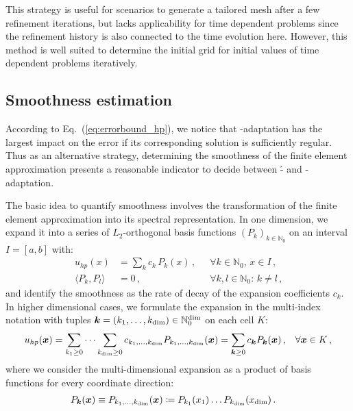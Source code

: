 This strategy is useful for scenarios to generate a tailored mesh after a few refinement iterations, but lacks applicability for time dependent problems since the refinement history is also connected to the time evolution here. However, this method is well suited to determine the initial grid for initial values of time dependent problems iteratively.



\subsection{Smoothness estimation}
\label{ssec:smoothness}

According to Eq.~(\ref{eq:errorbound_hp}), we notice that \p-adaptation has the largest impact on the error if its corresponding solution is sufficiently regular. Thus as an alternative strategy, determining the smoothness of the finite element approximation presents a reasonable indicator to decide between \h- and \p-adaptation.

The basic idea to quantify smoothness involves the transformation of the finite element approximation into its spectral representation. In one dimension, we expand it into a series of $L_2$-orthogonal basis functions $(P_k)_{k\in\mathbb{N}_0}$ on an interval $I = [a,b]$ with:
\begin{align}
u_{hp}(x) &= \sum\limits_{k} c_k \, P_k(x) \,\text{,} && \forall k \in \mathbb{N}_0 \text{, } x \in I \,\text{,} \\
\langle P_k, P_l \rangle &= 0 \,\text{,} && \forall k,l \in \mathbb{N}_0 \text{: } k \neq l \,\text{,}
\end{align}
and identify the smoothness as the rate of decay of the expansion coefficients $c_k$. In higher dimensional cases, we formulate the expansion in the multi-index notation with tuples $\tuple{k} = (k_1, \dots, k_\text{dim}) \in \mathbb{N}_0^\text{dim}$ on each cell $K$:
\begin{align}
u_{hp}(\vec{x}) &= \sum\limits_{k_1 \geq 0} \dots \sum\limits_{k_\text{dim} \geq 0} c_{k_1, \dots, k_{\text{dim}}} P_{k_1, \dots, k_{\text{dim}}}(\vec{x}) = \sum_{\tuple{k} \geq 0} c_\tuple{k} P_\tuple{k}(\vec{x}) \,\text{,}  & \forall \vec{x} \in K \,\text{,}
\end{align}
where we consider the multi-dimensional expansion as a product of basis functions for every coordinate direction:
\begin{align}
\label{eq:spectral_multi} P_{\tuple{k}}(\vec{x}) \equiv P_{k_1, \dots, k_{\text{dim}}}(\vec{x}) &\coloneqq P_{k_1}(x_1) \dots P_{k_\text{dim}}(x_\text{dim}) \,\text{.}
\end{align}

